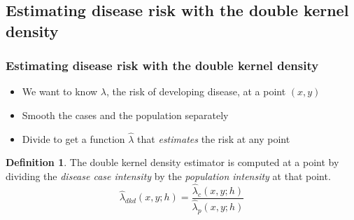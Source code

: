 \documentclass[notheorems]{beamer}
\theoremstyle{definition}
\newtheorem{definition}{Definition}
\theoremstyle{example}
\begin{document}
\subsection{Estimating disease risk with the double kernel density}
\begin{frame}\frametitle{Estimating disease risk with the double kernel density}
    \begin{itemize}
        \item We want to know $\lambda$, the risk of developing disease, at a point $(x,y)$
        \item Smooth the cases and the population separately
        \item Divide to get a function \textbf{$\hat{\lambda}$} that \emph{estimates} the risk at any point
    \end{itemize}
    \begin{definition}
        The \alert{double kernel density} estimator is computed at a point by dividing the \emph{disease case intensity} by the \emph{population intensity} at that point.
        \begin{equation*}
            \hat{\lambda}_{dkd}(x,y;h) = \frac{ \hat{\lambda}_{c}(x,y;h) } { \hat{\lambda}_{p}(x,y;h) }
        \end{equation*}
    \end{definition}
\end{frame}

\end{document}
